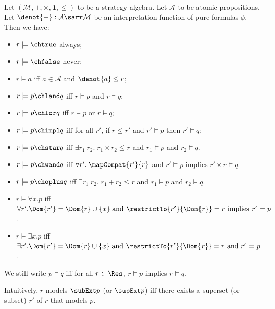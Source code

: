 \begin{definition} Let $(\mathcal{M},{+},{\times},\mathbf{1}, \leq)$ to be a strategy algebra. Let $\mathcal{A}$ to be atomic propositions. Let $\denot{-} : \mathcal{A} \sarr \mathcal{M}$ be an interpretation function of pure formulas $\phi$. Then we have:
\begin{itemize}
\item $r \models \chtrue$ always;
\item $r \models \chfalse$ never;
\item $r \models a$ iff $a \in \mathcal{A}$ and $\denot{a} \leq r$;
\item $r \models p \chland q$ iff $r \models p$ and $r \models q$;
\item $r \models p \chlor q$ iff $r \models p$ or $r \models q$;
\item $r \models p \chimpl q$ iff for all $r'$, if $r \leq r'$ and $r' \models p$ then $r' \models q$;
\item $r \models p \chstar q$ iff $\exists r_1\;r_2.\; r_1 \times r_2 \leq r$ and
  $r_1 \models p$ and $r_2 \models q$.
\item $r \models p \chwand q$ iff $\forall r'.\; \mapCompat{r'}{r}$ and $r' \models p$ implies
  $r' \times r \models q$.
\item $r \models p \choplus q$ iff $\exists r_1\;r_2.\; r_1 + r_2 \leq r$ and
  $r_1 \models p$ and $r_2 \models q$.
\item $r \models \forall x.p$ iff $\forall r'.\Dom{r'} = \Dom{r}\cup\{x\} \text{ and }\restrictTo{r'}{\Dom{r}} = r \text{ implies } r' \models p$.
\item $r \models \exists x.p$ iff $\exists r'.\Dom{r'} = \Dom{r}\cup\{x\} \text{ and }\restrictTo{r'}{\Dom{r}} = r \text{ and } r' \models p$.
\end{itemize}
We still write $p \models q$ iff for all $r \in \Res$, $r \models p$ implies $r \models q$.
\end{definition}

Intuitively, $r$ models $\subExt p$ (or $\supExt p$) iff there exists a superset (or subset) $r'$ of $r$ that models $p$.


